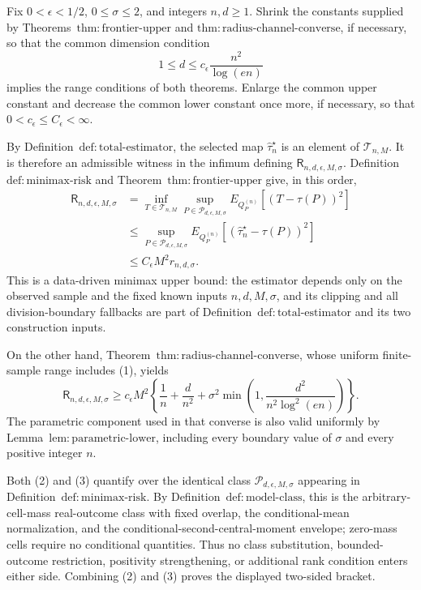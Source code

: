 Fix \(0<\epsilon<1/2\), \(0\le\sigma\le2\), and integers \(n,d\ge1\).  Shrink the constants supplied by Theorems~\(\mathrm{thm:frontier\text{-}upper}\) and \(\mathrm{thm:radius\text{-}channel\text{-}converse}\), if necessary, so that the common dimension condition
\[
 1\le d\le c_{\epsilon}\frac{n^2}{\log(en)}
\tag{1}
\]
implies the range conditions of both theorems.  Enlarge the common upper constant and decrease the common lower constant once more, if necessary, so that \(0<c_{\epsilon}\le C_{\epsilon}<\infty\).

By Definition~\(\mathrm{def:total\text{-}estimator}\), the selected map \(\widehat\tau_n^{\star}\) is an element of \(\mathcal T_{n,M}\).  It is therefore an admissible witness in the infimum defining \(\mathsf R_{n,d,\epsilon,M,\sigma}\).  Definition~\(\mathrm{def:minimax\text{-}risk}\) and Theorem~\(\mathrm{thm:frontier\text{-}upper}\) give, in this order,
\[
\begin{aligned}
 \mathsf R_{n,d,\epsilon,M,\sigma}
 &=\inf_{T\in\mathcal T_{n,M}}
   \sup_{P\in\mathcal P_{d,\epsilon,M,\sigma}}
   E_{Q_P^{(n)}}[(T-\tau(P))^2]\\
 &\le
   \sup_{P\in\mathcal P_{d,\epsilon,M,\sigma}}
   E_{Q_P^{(n)}}[(\widehat\tau_n^{\star}-\tau(P))^2]\\
 &\le C_{\epsilon}M^2r_{n,d,\sigma}.
\end{aligned}
\tag{2}
\]
This is a data-driven minimax upper bound: the estimator depends only on the observed sample and the fixed known inputs \(n,d,M,\sigma\), and its clipping and all division-boundary fallbacks are part of Definition~\(\mathrm{def:total\text{-}estimator}\) and its two construction inputs.

On the other hand, Theorem~\(\mathrm{thm:radius\text{-}channel\text{-}converse}\), whose uniform finite-sample range includes (1), yields
\[
 \mathsf R_{n,d,\epsilon,M,\sigma}
 \ge c_{\epsilon}M^2\left\{
 \frac1n+\frac d{n^2}
 +\sigma^2\min\left(1,\frac{d^2}{n^2\log^2(en)}\right)
 \right\}.
\tag{3}
\]
The parametric component used in that converse is also valid uniformly by Lemma~\(\mathrm{lem:parametric\text{-}lower}\), including every boundary value of \(\sigma\) and every positive integer \(n\).

Both (2) and (3) quantify over the identical class \(\mathcal P_{d,\epsilon,M,\sigma}\) appearing in Definition~\(\mathrm{def:minimax\text{-}risk}\).  By Definition~\(\mathrm{def:model\text{-}class}\), this is the arbitrary-cell-mass real-outcome class with fixed overlap, the conditional-mean normalization, and the conditional-second-central-moment envelope; zero-mass cells require no conditional quantities.  Thus no class substitution, bounded-outcome restriction, positivity strengthening, or additional rank condition enters either side.  Combining (2) and (3) proves the displayed two-sided bracket.

